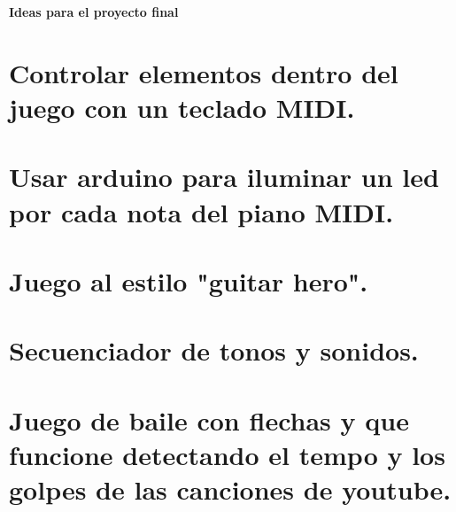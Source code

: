 \documentclass{article}
\begin{document}
\newpage

            
   \Huge
        \textbf{Ideas para el proyecto final}
 \section{Controlar elementos dentro del juego con un teclado MIDI.}
\section{Usar arduino para iluminar un led por cada nota del piano MIDI.}
\section{Juego al estilo "guitar hero".}
\section{Secuenciador de tonos y sonidos.}
\section{Juego de baile con flechas y que funcione detectando el tempo y los golpes de las canciones de youtube.}
\end{document}

